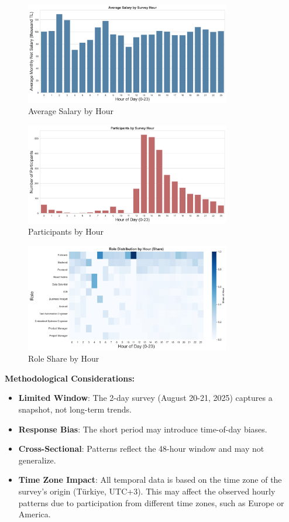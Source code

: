 \documentclass[12pt,a4paper]{article}
\begin{document}
\begin{figure}[H]
	\centering
	\includegraphics[width=0.8\textwidth]{figures/barplot_hourly_avg_salary.png}
	\caption{Average Salary by Hour}
\end{figure}

\begin{figure}[H]
	\centering
	\includegraphics[width=0.8\textwidth]{figures/barplot_hourly_participants.png}
	\caption{Participants by Hour}
\end{figure}

\begin{figure}[H]
	\centering
	\includegraphics[width=0.8\textwidth]{figures/heatmap_roles_by_hour.png}
	\caption{Role Share by Hour}
\end{figure}

\textbf{Methodological Considerations:}
\begin{itemize}
	\item \textbf{Limited Window}: The 2-day survey (August 20-21, 2025) captures a snapshot, not long-term trends.
	\item \textbf{Response Bias}: The short period may introduce time-of-day biases.
	\item \textbf{Cross-Sectional}: Patterns reflect the 48-hour window and may not generalize.
    \item \textbf{Time Zone Impact}: All temporal data is based on the time zone of the survey's origin (Türkiye, UTC+3). This may affect the observed hourly patterns due to participation from different time zones, such as Europe or America.
\end{itemize}
\end{document}
